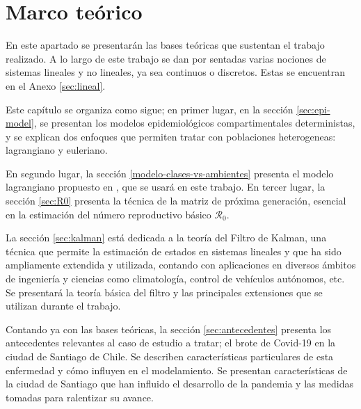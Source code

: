 \chapter{Marco teórico}



En este apartado se presentarán las bases teóricas que sustentan el trabajo realizado. A lo largo de este trabajo se dan por sentadas varias nociones de sistemas lineales y no lineales, ya sea continuos o discretos. Estas se encuentran en el Anexo \ref{sec:lineal}.

Este capítulo se organiza como sigue; en primer lugar, en la sección \ref{sec:epi-model}, se presentan los modelos epidemiológicos compartimentales deterministas, y se explican dos enfoques que permiten tratar con poblaciones heterogeneas: lagrangiano y euleriano. 

En segundo lugar, la sección \ref{modelo-clases-vs-ambientes} presenta el modelo lagrangiano propuesto en \cite{Bichara2015}, que se usará en este trabajo. En tercer lugar, la sección \ref{sec:R0} presenta la técnica de la matriz de próxima generación, esencial en la estimación del número reproductivo básico \(\mathcal{R}_0\).

La sección \ref{sec:kalman} está dedicada a la teoría del Filtro de Kalman, una técnica que permite la estimación de estados en sistemas lineales y que ha sido ampliamente extendida y utilizada, contando con aplicaciones en diversos ámbitos de ingeniería y ciencias como climatología, control de vehículos autónomos, etc. Se presentará la teoría básica del filtro y las principales extensiones que se utilizan durante el trabajo.

Contando ya con las bases teóricas, la sección \ref{sec:antecedentes} presenta los antecedentes relevantes al caso de estudio a tratar; el brote de Covid-19 en la ciudad de Santiago de Chile. Se describen características particulares de esta enfermedad y cómo influyen en el modelamiento. Se presentan características de la ciudad de Santiago que han influido el desarrollo de la pandemia y las medidas tomadas para ralentizar su avance.


